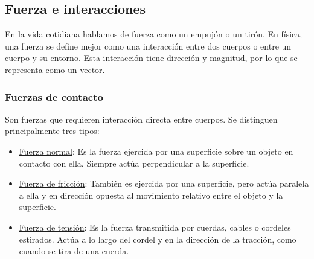 \documentclass{article}
\newcommand{\newsubsection}[1]{
    \vspace{0.5cm}
    \color{sectionColor}
    \subsection{\bl{#1}}
    \color{black}
    \vspace{0.5cm}
}
\newcommand{\newtitle}[1]{
    \color{titleColor}
    \subsubsection{#1}
    \color{black}
}
\newcommand{\bl}[1]{\textbf{#1}}
\begin{document}

    \newsubsection{Fuerza e interacciones}

        \par En la vida cotidiana hablamos de fuerza como un empujón o un tirón. En física, una fuerza se define mejor como una interacción entre dos cuerpos o entre un cuerpo y su entorno. Esta interacción tiene dirección y magnitud, por lo que se representa como un vector.

    \newtitle{Fuerzas de contacto}

        \par Son fuerzas que requieren interacción directa entre cuerpos. Se distinguen principalmente tres tipos:

        \begin{itemize}
            \item \underline{Fuerza normal}: Es la fuerza ejercida por una superficie sobre un objeto en contacto con ella. Siempre actúa perpendicular a la superficie.
            \item \underline{Fuerza de fricción}: También es ejercida por una superficie, pero actúa paralela a ella y en dirección opuesta al movimiento relativo entre el objeto y la superficie.
            \item \underline{Fuerza de tensión}: Es la fuerza transmitida por cuerdas, cables o cordeles estirados. Actúa a lo largo del cordel y en la dirección de la tracción, como cuando se tira de una cuerda.
        \end{itemize}
\end{document}
